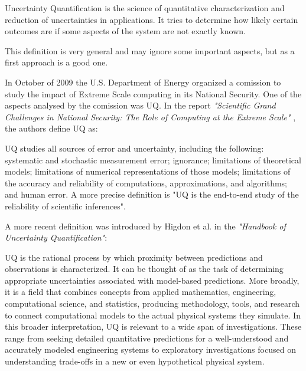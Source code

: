 \begin{defn}
Uncertainty Quantification is the science of quantitative characterization and reduction of uncertainties in applications. It tries to determine how likely certain outcomes are if some aspects of the system are not exactly known.
\end{defn}

This definition is very general and may ignore some important aspects, but as a first approach is a good one. 

In October of 2009 the U.S. Department of Energy organized a comission to study the impact of Extreme Scale computing in its National Security. One of the aspects analysed by the comission was UQ. In the report \textit{"Scientific Grand Challenges in National Security: The Role of Computing at the Extreme Scale"} \cite{DEnergy2009}, the authors define UQ as:

\begin{defn}
UQ studies all sources of error and uncertainty, including the following: systematic and stochastic measurement error; ignorance; limitations of theoretical models; limitations of numerical representations of those models; limitations of the accuracy and reliability of computations, approximations, and algorithms; and human error. A more precise definition is "UQ is the end-to-end  study of the reliability of scientific inferences". \cite{DEnergy2009}
\end{defn}

A more recent definition was introduced by Higdon et al. \cite{Higdon2017} in the \textit{"Handbook of Uncertainty Quantification"}:

\begin{defn}
UQ is the rational process by which proximity between predictions and observations is characterized. It can be thought of as the task of determining appropriate uncertainties associated with model-based predictions. More broadly, it is a field that combines concepts from applied mathematics, engineering, computational science, and statistics, producing methodology, tools, and research to connect computational models to the actual physical systems they simulate. In this broader interpretation, UQ is relevant to a wide span of investigations. These range from seeking detailed quantitative predictions for a well-understood and accurately modeled engineering systems to exploratory investigations focused on understanding trade-offs in a new or even hypothetical physical system. \cite{Higdon2017}
\end{defn}

